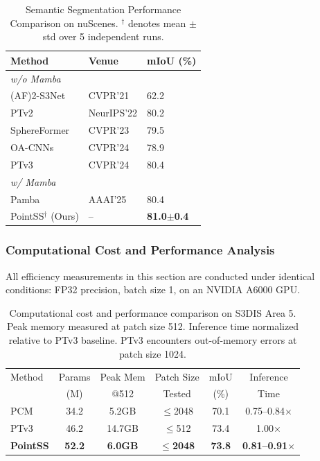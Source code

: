 \documentclass[a4paper,fleqn]{cas-sc}
\begin{document}
\begin{table}
	\centering
	\caption{Semantic Segmentation Performance Comparison on nuScenes. $^\dagger$ denotes mean $\pm$ std over 5 independent runs.}
	\label{tab:nuscenes}
	\begin{tabular}{@{}lll@{}}
		\toprule
		\textbf{Method} & \textbf{Venue} & \textbf{mIoU (\%)} \\ \midrule
		\multicolumn{3}{l}{\textit{w/o Mamba}} \\
		(AF)2-S3Net \cite{af2s3net} & CVPR'21 & 62.2 \\
		PTv2 \cite{ptv2} & NeurIPS'22 & 80.2 \\
		SphereFormer \cite{sphereformer} & CVPR'23 & 79.5 \\
		OA-CNNs \cite{oacnn} & CVPR'24 & 78.9 \\
		PTv3 \cite{ptv3} & CVPR'24 & 80.4 \\ \midrule
		\multicolumn{3}{l}{\textit{w/ Mamba}} \\
		Pamba \cite{pamba} & AAAI'25 & 80.4 \\
		PointSS$^\dagger$ (Ours) & -- & \textbf{81.0$\pm$0.4} \\ \bottomrule
	\end{tabular}
\end{table}

\subsubsection{Computational Cost and Performance Analysis}

All efficiency measurements in this section are conducted under identical conditions: FP32 precision, batch size 1, on an NVIDIA A6000 GPU.

\begin{table}[t]
\centering
\caption{Computational cost and performance comparison on S3DIS Area 5. Peak memory measured at patch size 512. Inference time normalized relative to PTv3 baseline. PTv3 encounters out-of-memory errors at patch size 1024.}
\label{tab:efficiency}
\begin{tabular}{lccccc}
\toprule
Method & Params & Peak Mem & Patch Size & mIoU & Inference \\
       & (M)    & @512     & Tested     & (\%)  & Time \\
\midrule
PCM    & 34.2   & 5.2GB    & $\leq$2048      & 70.1  & 0.75--0.84$\times$ \\
PTv3   & 46.2   & 14.7GB   & $\leq$512       & 73.4  & 1.00$\times$ \\
\textbf{PointSS} & \textbf{52.2} & \textbf{6.0GB} & \textbf{$\leq$2048} & \textbf{73.8} & \textbf{0.81--0.91}$\times$ \\
\bottomrule
\end{tabular}
\end{table}
\end{document}
